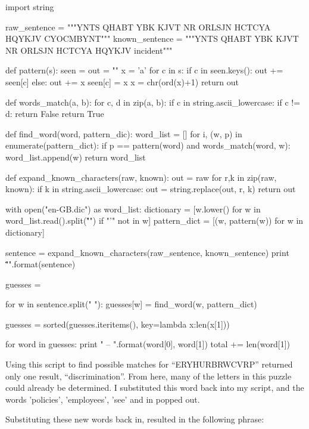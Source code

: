 \documentclass[12pt,a4paper,twoside]{article}
\begin{document}
\begin{python}
import string


raw_sentence =   """YNTS QHABT YBK KJVT NR ORLSJN 
                 HCTCYA HQYKJV CYOCMBYNT"""
known_sentence = """YNTS QHABT YBK KJVT NR ORLSJN 
                 HCTCYA HQYKJV incident"""


def pattern(s):
    seen = {}
    out = ""
    x = 'a'
    for c in s:
        if c in seen.keys():
            out += seen[c]
        else:
            out += x
            seen[c] = x
            x = chr(ord(x)+1)
    return out

def words_match(a, b):
    for c, d in zip(a, b):
        if c in string.ascii_lowercase:
            if c != d:
                return False
    return True

def find_word(word, pattern_dic):
    word_list = []
    for i, (w, p) in enumerate(pattern_dict):
        if p == pattern(word) and words_match(word, w):
            word_list.append(w)
    return word_list

def expand_known_characters(raw, known):
    out = raw
    for r,k in zip(raw, known): 
      if k in string.ascii_lowercase:
          out = string.replace(out, r, k)
    return out

with open("en-GB.dic") as word_list:
    dictionary = [w.lower() for w 
                  in word_list.read().split("\r\n") 
                  if "'" not in w]
    pattern_dict = [(w, pattern(w)) for w in dictionary]

sentence = expand_known_characters(raw_sentence, 
                                   known_sentence)
print "\"{}\"\n".format(sentence)

guesses = {}

for w in sentence.split(" "):
    guesses[w] = find_word(w, pattern_dict)

guesses = sorted(guesses.iteritems(), key=lambda x:len(x[1]))

for word in guesses:
    print "{} -- {}\n".format(word[0], word[1])
    total += len(word[1])
\end{python}

Using this script to find possible matches for ``ERYHURBRWCVRP'' returned only
one result, ``discrimination''. From here, many of the letters in this puzzle
could already be determined. I substituted this word back into my script, and
the words 'policies', 'employees', 'see' and in popped out. 

Substituting these new words back in, resulted in the following phrase: 
\end{document}
